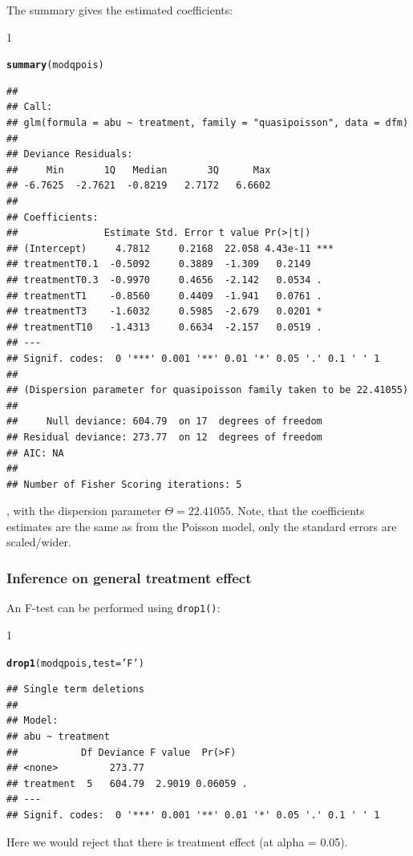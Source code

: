 \documentclass{scrartcl}\usepackage[]{graphicx}\usepackage[]{color}
\makeatletter
\newcommand{\hlstr}[1]{\textcolor[rgb]{0.192,0.494,0.8}{#1}}%
\newcommand{\hlstd}[1]{\textcolor[rgb]{0.345,0.345,0.345}{#1}}%
\newcommand{\hlkwc}[1]{\textcolor[rgb]{0.333,0.667,0.333}{#1}}%
\newcommand{\hlkwd}[1]{\textcolor[rgb]{0.737,0.353,0.396}{\textbf{#1}}}%
\newenvironment{kframe}{%
 \def\at@end@of@kframe{}%
 \ifinner\ifhmode%
  \def\at@end@of@kframe{\end{minipage}}%
  \begin{minipage}{\columnwidth}%
 \fi\fi%
 \def\FrameCommand##1{\hskip\@totalleftmargin \hskip-\fboxsep
 \colorbox{shadecolor}{##1}\hskip-\fboxsep
     \hskip-\linewidth \hskip-\@totalleftmargin \hskip\columnwidth}%
 \MakeFramed {\advance\hsize-\width
   \@totalleftmargin\z@ \linewidth\hsize
   \@setminipage}}%
 {\par\unskip\endMakeFramed%
 \at@end@of@kframe}
\newenvironment{knitrout}{}{} %
\renewenvironment{knitrout}{\begin{spacing}{1}}{\end{spacing}}
\makeatother
\begin{document}
The summary gives the estimated coefficients:
\begin{knitrout}
\color{fgcolor}\begin{kframe}
\begin{alltt}
\hlkwd{summary}\hlstd{(modqpois)}
\end{alltt}
\begin{verbatim}
## 
## Call:
## glm(formula = abu ~ treatment, family = "quasipoisson", data = dfm)
## 
## Deviance Residuals: 
##     Min       1Q   Median       3Q      Max  
## -6.7625  -2.7621  -0.8219   2.7172   6.6602  
## 
## Coefficients:
##               Estimate Std. Error t value Pr(>|t|)    
## (Intercept)     4.7812     0.2168  22.058 4.43e-11 ***
## treatmentT0.1  -0.5092     0.3889  -1.309   0.2149    
## treatmentT0.3  -0.9970     0.4656  -2.142   0.0534 .  
## treatmentT1    -0.8560     0.4409  -1.941   0.0761 .  
## treatmentT3    -1.6032     0.5985  -2.679   0.0201 *  
## treatmentT10   -1.4313     0.6634  -2.157   0.0519 .  
## ---
## Signif. codes:  0 '***' 0.001 '**' 0.01 '*' 0.05 '.' 0.1 ' ' 1
## 
## (Dispersion parameter for quasipoisson family taken to be 22.41055)
## 
##     Null deviance: 604.79  on 17  degrees of freedom
## Residual deviance: 273.77  on 12  degrees of freedom
## AIC: NA
## 
## Number of Fisher Scoring iterations: 5
\end{verbatim}
\end{kframe}
\end{knitrout}

, with the dispersion parameter $\Theta = 22.41055$. 
Note, that the coefficients estimates are the same as from the Poisson model, only the standard errors are scaled/wider.

\subsubsection{Inference on general treatment effect}
An F-test can be performed using \texttt{drop1()}:
\begin{knitrout}
\color{fgcolor}\begin{kframe}
\begin{alltt}
\hlkwd{drop1}\hlstd{(modqpois,} \hlkwc{test} \hlstd{=} \hlstr{'F'}\hlstd{)}
\end{alltt}
\begin{verbatim}
## Single term deletions
## 
## Model:
## abu ~ treatment
##           Df Deviance F value  Pr(>F)  
## <none>         273.77                  
## treatment  5   604.79  2.9019 0.06059 .
## ---
## Signif. codes:  0 '***' 0.001 '**' 0.01 '*' 0.05 '.' 0.1 ' ' 1
\end{verbatim}
\end{kframe}
\end{knitrout}
Here we would reject that there is treatment effect (at alpha = 0.05).
\end{document}
